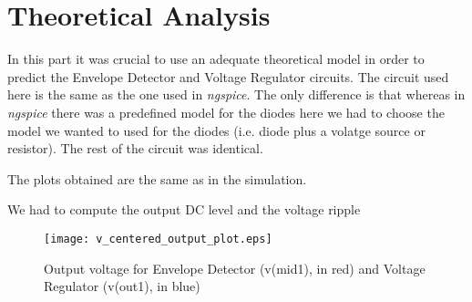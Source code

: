 \section{Theoretical Analysis}
\label{sec:analysis}



In this part it was crucial to use an adequate theoretical model in order to predict the Envelope Detector and Voltage Regulator circuits. The circuit used here is the same as the one used in \textit{ngspice}. The only difference is that whereas in \textit{ngspice} there was a predefined model for the diodes here we had to choose the model we wanted to used for the diodes (i.e. diode plus a volatge source or resistor). The rest of the circuit was identical.

The plots obtained are the same as in the simulation.

We had to compute the output DC level and the voltage ripple


\begin{figure}[H] \centering
\texttt{[image: v\_centered\_output\_plot.eps]}
\caption{Output voltage for Envelope Detector (v(mid1), in red) and Voltage Regulator (v(out1), in blue)}
\label{fig:phase_sim}
\end{figure}
